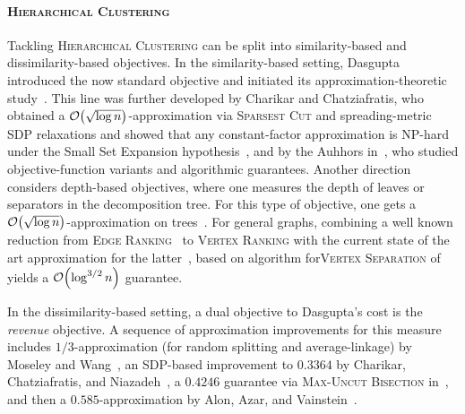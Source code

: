 \paragraph{\textsc{Hierarchical Clustering}}
Tackling \textsc{Hierarchical Clustering} can be split into similarity-based and dissimilarity-based objectives. In the similarity-based setting, Dasgupta introduced the now standard objective and initiated its approximation-theoretic study~\cite{ACostFunctionForSimilarityBasedHierarchicalClustering}. This line was further developed by Charikar and Chatziafratis, who obtained a $\mathcal{O}\mathopen{}\left( \sqrt{\log n} \right)$-approximation via \textsc{Sparsest Cut} and spreading-metric SDP relaxations and showed that any constant-factor approximation is NP-hard under the Small Set Expansion hypothesis~\cite{ApproximateHierarchicalClusteringViaSparsestCutAndSpreadingMetrics}, and by the Auhhors in~\cite{Hierarchical_Clustering_Objective_Functions_and_Algorithms}, who studied objective-function variants and algorithmic guarantees. Another direction considers depth-based objectives, where one measures the depth of leaves or separators in the decomposition tree. For this type of objective, one gets a $\mathcal{O}\mathopen{}\left( \sqrt{\log n} \right)$-approximation on trees~\cite{DereniowskiKosowskiUznanskiZouICALP2017}. For general graphs, combining a well known reduction from \textsc{Edge Ranking}~\cite{RankingsOfGraphs1998} to \textsc{Vertex Ranking} with the current state of the art approximation for the latter~\cite{Approximating_Treewidth_Pathwidth_Frontsize_and_Shortest_Elimination_Tree}, based on algorithm for\textsc{Vertex Separation} of~\cite{FeigeHajiaghayiLee2005} yields a $\mathcal{O}\mathopen{}\left( \log^{3/2} n \right)$ guarantee.

In the dissimilarity-based setting, a dual objective to Dasgupta's cost is the \emph{revenue} objective. A sequence of approximation improvements for this measure includes $1/3$-approximation (for random splitting and average-linkage) by Moseley and Wang~\cite{MoseleyWangNIPS2017}, an SDP-based improvement to $0.3364$ by Charikar, Chatziafratis, and Niazadeh~\cite{CharikarChatziafratisNiazadehSODA2019}, a $0.4246$ guarantee via \textsc{Max-Uncut Bisection} in~\cite{BisectAndConquer2020}, and then a $0.585$-approximation by Alon, Azar, and Vainstein~\cite{AlonAzarVainsteinCOLT2020}.

